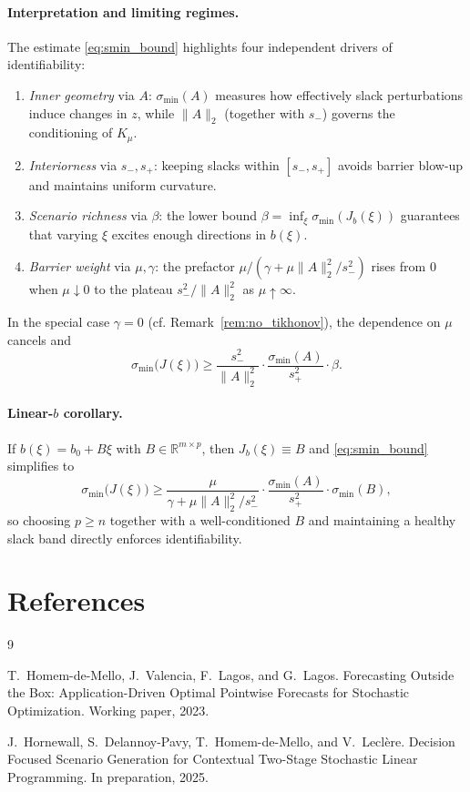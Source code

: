 \documentclass[11pt]{article}
\theoremstyle{remark}
\begin{document}
\paragraph{Interpretation and limiting regimes.}
The estimate \eqref{eq:smin_bound} highlights four independent drivers of identifiability:
\begin{enumerate}[leftmargin=2em]
\item \emph{Inner geometry} via $A$: $\sigma_{\min}(A)$ measures how effectively slack perturbations induce changes in $z$, while $\|A\|_2$ (together with $s_-$) governs the conditioning of $K_\mu$.
\item \emph{Interiorness} via $s_-,s_+$: keeping slacks within $[s_-,s_+]$ avoids barrier blow-up and maintains uniform curvature.
\item \emph{Scenario richness} via $\beta$: the lower bound $\beta=\inf_\xi \sigma_{\min}(J_b(\xi))$ guarantees that varying $\xi$ excites enough directions in $b(\xi)$.
\item \emph{Barrier weight} via $\mu,\gamma$: the prefactor $\mu/(\gamma+\mu\|A\|_2^2/s_-^2)$ rises from $0$ when $\mu\downarrow0$ to the plateau $s_-^2/\|A\|_2^2$ as $\mu\uparrow\infty$.
\end{enumerate}
In the special case $\gamma=0$ (cf. Remark~\ref{rem:no_tikhonov}), the dependence on $\mu$ cancels and
\begin{equation*}
\sigma_{\min}\big(J(\xi)\big)\ge \frac{s_-^{2}}{\|A\|_2^{2}}\cdot\frac{\sigma_{\min}(A)}{s_+^{2}}\cdot\beta.
\end{equation*}

\paragraph{Linear-$b$ corollary.}
If $b(\xi)=b_0+B\xi$ with $B\in\mathbb R^{m\times p}$, then $J_b(\xi)\equiv B$ and \eqref{eq:smin_bound} simplifies to
\begin{equation*}
\sigma_{\min}\big(J(\xi)\big)\ge \frac{\mu}{\gamma+\mu\|A\|_2^2/s_-^{2}}\cdot\frac{\sigma_{\min}(A)}{s_+^{2}}\cdot\sigma_{\min}(B),
\end{equation*}
so choosing $p\ge n$ together with a well-conditioned $B$ and maintaining a healthy slack band directly enforces identifiability.



\section*{References}
\begin{thebibliography}{9}

T.~Homem-de-Mello, J.~Valencia, F.~Lagos, and G.~Lagos.
\newblock Forecasting Outside the Box: Application-Driven Optimal Pointwise
Forecasts for Stochastic Optimization.
\newblock Working paper, 2023.

J.~Hornewall, S.~Delannoy-Pavy, T.~Homem-de-Mello, and V.~Leclère.
\newblock Decision Focused Scenario Generation for Contextual Two-Stage
Stochastic Linear Programming.
\newblock In preparation, 2025.

\end{thebibliography}
\end{document}
